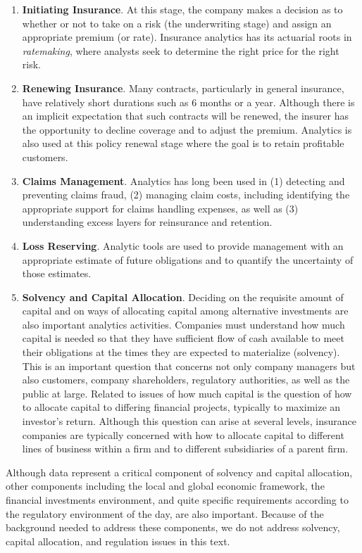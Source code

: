 \documentclass[
]{book}
\providecommand{\tightlist}{%
  \setlength{\itemsep}{0pt}\setlength{\parskip}{0pt}}
\begin{document}
\begin{enumerate}
\def\labelenumi{\arabic{enumi}.}
\tightlist
\item
  \textbf{Initiating Insurance}. At this stage, the company makes a
  decision as to whether or not to take on a risk (the
  underwriting stage) and assign an appropriate
  premium (or rate). Insurance analytics has its actuarial roots in \emph{ratemaking}, where
  analysts seek to determine the right price for the right risk.
\item
  \textbf{Renewing Insurance}. Many contracts, particularly in general
  insurance, have relatively short durations such as 6 months or
  a year. Although there is an implicit expectation that such
  contracts will be renewed, the insurer has the opportunity to
  decline coverage and to adjust the premium. Analytics is also used
  at this policy renewal stage where the goal is to retain
  profitable customers.
\item
  \textbf{Claims Management}. Analytics has long been used in (1) detecting
  and preventing claims fraud, (2) managing claim costs, including
  identifying the appropriate support for claims handling expenses, as
  well as (3) understanding excess layers for reinsurance
  and retention.
\item
  \textbf{Loss Reserving}. Analytic tools are used to provide management
  with an appropriate estimate of future obligations and to quantify
  the uncertainty of those estimates.
\item
  \textbf{Solvency and Capital Allocation}. Deciding on the requisite
  amount of capital and on ways of allocating capital among alternative
  investments are also important
  analytics activities. Companies must understand how much capital is
  needed so that they have sufficient flow of cash available to
  meet their obligations at the times they are expected to materialize (solvency). This is an important question that concerns
  not only company managers but also customers, company shareholders,
  regulatory authorities, as well as the public at large. Related to
  issues of how much capital is the question of how to allocate
  capital to differing financial projects, typically to maximize an
  investor's return. Although this question can arise at several
  levels, insurance companies are typically concerned with how to
  allocate capital to different lines of business within a firm and to
  different subsidiaries of a parent firm.
\end{enumerate}

Although data represent a critical component of solvency and capital
allocation, other components including the local and global economic framework, the financial investments environment, and quite specific requirements according to the regulatory environment of the day, are also important. Because of the
background needed to address these components, we do not address
solvency, capital allocation, and regulation issues in this text.
\end{document}
